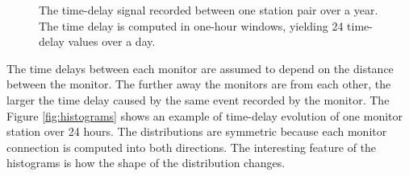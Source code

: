 \documentclass[12pt,a4paper,english]{article}
\begin{document}
\begin{figure}[ht] 
  \centering 
{}
\caption{The time-delay signal recorded between one station pair over a year. The time delay is computed in one-hour windows, yielding 24 time-delay values over a day.}
\label{fig:examplesignal}
\end{figure}



The time delays between each monitor are assumed to depend on the distance between the monitor. The further away the monitors are from each other, the larger the time delay caused by the same event recorded by the monitor. The Figure \ref{fig:histograms} shows an example of time-delay evolution of one monitor station over 24 hours. The distributions  are symmetric because each monitor connection is computed into both directions. The interesting feature of the histograms is how the shape of the distribution changes. 
\end{document}
